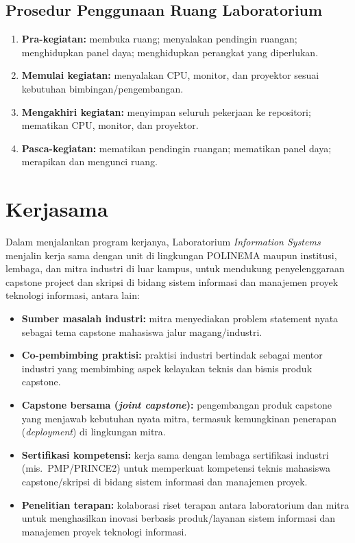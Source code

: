 \documentclass[12pt,a4paper]{report}
\begin{document}
\section{Prosedur Penggunaan Ruang Laboratorium}
\begin{enumerate}
\item \textbf{Pra-kegiatan:} membuka ruang; menyalakan pendingin ruangan; menghidupkan panel daya; menghidupkan perangkat yang diperlukan.
\item \textbf{Memulai kegiatan:} menyalakan CPU, monitor, dan proyektor sesuai kebutuhan bimbingan/pengembangan.
\item \textbf{Mengakhiri kegiatan:} menyimpan seluruh pekerjaan ke repositori; mematikan CPU, monitor, dan proyektor.
\item \textbf{Pasca-kegiatan:} mematikan pendingin ruangan; mematikan panel daya; merapikan dan mengunci ruang.
\end{enumerate}

\chapter{Kerjasama}

Dalam menjalankan program kerjanya, Laboratorium \emph{Information Systems} menjalin kerja sama dengan unit di lingkungan POLINEMA maupun institusi, lembaga, dan mitra industri di luar kampus, untuk mendukung penyelenggaraan capstone project dan skripsi di bidang sistem informasi dan manajemen proyek teknologi informasi, antara lain:
\begin{itemize}
\item \textbf{Sumber masalah industri:} mitra menyediakan problem statement nyata sebagai tema capstone mahasiswa jalur magang/industri.
\item \textbf{Co-pembimbing praktisi:} praktisi industri bertindak sebagai mentor industri yang membimbing aspek kelayakan teknis dan bisnis produk capstone.
\item \textbf{Capstone bersama (\emph{joint capstone}):} pengembangan produk capstone yang menjawab kebutuhan nyata mitra, termasuk kemungkinan penerapan (\emph{deployment}) di lingkungan mitra.
\item \textbf{Sertifikasi kompetensi:} kerja sama dengan lembaga sertifikasi industri (mis.\ PMP/PRINCE2) untuk memperkuat kompetensi teknis mahasiswa capstone/skripsi di bidang sistem informasi dan manajemen proyek.
\item \textbf{Penelitian terapan:} kolaborasi riset terapan antara laboratorium dan mitra untuk menghasilkan inovasi berbasis produk/layanan sistem informasi dan manajemen proyek teknologi informasi.
\end{itemize}

\PedomanPengesahan
\end{document}

